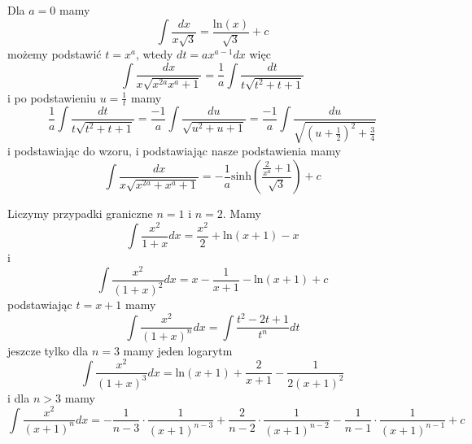 \documentclass[11pt]{scrartcl}
\begin{document}
\begin{walk}
            
            \item Dla $a = 0$ mamy
              \[
                  \int \frac{dx}{x \sqrt{3} } = \frac{\text{ln} \left ( x \right ) }{\sqrt{3} } + c
              \]
              możemy podstawić $t = x^a$, wtedy $dt = a x^{a-1} dx$ więc 
              \[
                \int \frac{dx}{x \sqrt{x^{2a} x^a + 1}  } = \frac{1}{a} \int \frac{dt}{t \sqrt{t^2 + t + 1} }
              \]
              i po podstawieniu $u = \frac{1}{t}$ mamy
              \[
                \frac{1}{a} \int \frac{dt}{t \sqrt{t^2 + t + 1} } = \frac{-1}{a} \int \frac{du}{\sqrt{u^2 + u + 1} } = \frac{-1}{a} \int \frac{du}{\sqrt{\left ( u + \frac{1}{2} \right )^2 + \frac{3}{4} } }
              \]
              i podstawiając do wzoru, i podstawiając nasze podstawienia mamy 
              \[
                \int \frac{dx}{x \sqrt{x^{2a} + x^a + 1} } = - \frac{1}{a} \text{sinh} \left ( \frac{\frac{2}{x^a} + 1}{\sqrt{3} } \right ) + c
              \]
            \item Liczymy przypadki graniczne $n = 1$ i $n = 2$. Mamy
              \[
                  \int \frac{x^2}{1 + x} dx = \frac{x^2}{2} + \text{ln} \left ( x + 1 \right ) - x 
              \]
              i
              \[
                  \int \frac{x^2}{\left ( 1 + x \right )^2} dx = x - \frac{1}{x+1} - \text{ln} \left ( x + 1 \right ) + c
              \]
              podstawiając $ t = x + 1$ mamy 
              \[
                  \int \frac{x^2}{(1+x)^n} dx = \int \frac{t^2 - 2t + 1}{t^n} dt
              \]
              jeszcze tylko dla $n = 3$ mamy jeden logarytm
              \[
                  \int \frac{x^2}{(1+x)^3} dx = \text{ln} \left ( x + 1 \right ) + \frac{2}{x+1} - \frac{1}{2(x+1)^2} 
              \]
              i dla $n > 3$ mamy
              \[
                \int \frac{x^2}{(x+1)^n} dx = - \frac{1}{n-3} \cdot \frac{1}{(x+1)^{n-3}} + \frac{2}{n-2} \cdot \frac{1}{(x+1)^{n-2}} - \frac{1}{n-1} \cdot \frac{1}{(x+1)^{n-1}} + c
              \]
              
              
        \end{walk}


        
\end{document}
